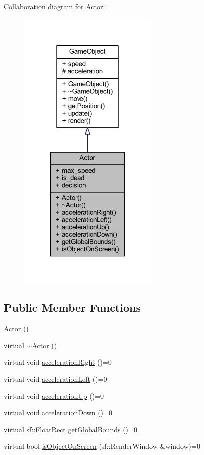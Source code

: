 Collaboration diagram for Actor\+:
\nopagebreak
\begin{figure}[H]
\begin{center}
\leavevmode
\includegraphics[width=191pt]{class_actor__coll__graph}
\end{center}
\end{figure}
\subsection*{Public Member Functions}
\begin{DoxyCompactItemize}
\item 
\hyperlink{class_actor_a2a0ff4335a1ee9096df90f288c026c8b}{Actor} ()
\item 
virtual \hyperlink{class_actor_ad807fe8f85e72ab263a0c05e3231cb39}{$\sim$\+Actor} ()
\item 
virtual void \hyperlink{class_actor_ab48f5d34a91c27dffba96d497b70f37b}{acceleration\+Right} ()=0
\item 
virtual void \hyperlink{class_actor_ad447288ba0b7202ffd778815f4a5ee5d}{acceleration\+Left} ()=0
\item 
virtual void \hyperlink{class_actor_aa9819c45f4e0f8903a81e174a68ec983}{acceleration\+Up} ()=0
\item 
virtual void \hyperlink{class_actor_a347730f4e82dbbbb2bf45027634faa1a}{acceleration\+Down} ()=0
\item 
virtual sf\+::\+Float\+Rect \hyperlink{class_actor_ab56cff32076fef8392f4562fe281ea86}{get\+Global\+Bounds} ()=0
\item 
virtual bool \hyperlink{class_actor_a0bd104ef42ef1e3c3eea5c58e94c2429}{is\+Object\+On\+Screen} (sf\+::\+Render\+Window \&window)=0
\end{DoxyCompactItemize}
